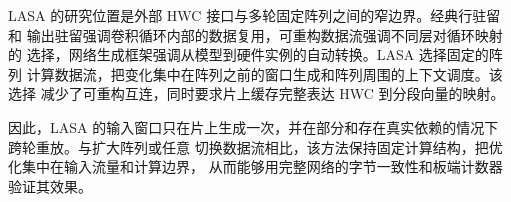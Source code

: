 LASA 的研究位置是外部 HWC 接口与多轮固定阵列之间的窄边界。经典行驻留和
输出驻留强调卷积循环内部的数据复用，可重构数据流强调不同层对循环映射的
选择，网络生成框架强调从模型到硬件实例的自动转换。LASA 选择固定的阵列
计算数据流，把变化集中在阵列之前的窗口生成和阵列周围的上下文调度。该选择
减少了可重构互连，同时要求片上缓存完整表达 HWC 到分段向量的映射。

因此，LASA 的输入窗口只在片上生成一次，并在部分和存在真实依赖的情况下
跨轮重放。与扩大阵列或任意
切换数据流相比，该方法保持固定计算结构，把优化集中在输入流量和计算边界，
从而能够用完整网络的字节一致性和板端计数器验证其效果。
